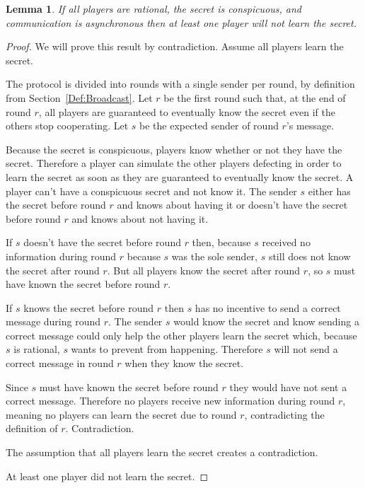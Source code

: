 \documentclass[12pt]{dalcsthesis}
\newtheorem{lemma}{Lemma}
\begin{document}
\begin{lemma}\label{Lem:Async:ConspicuousMustSacrifice}If all players are rational, the secret is conspicuous, and communication is asynchronous then at least one player will not learn the secret.\end{lemma}
\begin{proof}
We will prove this result by contradiction. Assume all players learn the secret.

The protocol is divided into rounds with a single sender per round, by definition from Section~\ref{Def:Broadcast}. Let $r$ be the first round such that, at the end of round $r$, all players are guaranteed to eventually know the secret even if the others stop cooperating. Let $s$ be the expected sender of round $r$'s message.

Because the secret is conspicuous, players know whether or not they have the secret. Therefore a player can simulate the other players defecting in order to learn the secret as soon as they are guaranteed to eventually know the secret. A player can't have a conspicuous secret and not know it. The sender $s$ either has the secret before round $r$ and knows about having it or doesn't have the secret before round $r$ and knows about not having it.

If $s$ doesn't have the secret before round $r$ then, because $s$ received no information during round $r$ because $s$ was the sole sender, $s$ still does not know the secret after round $r$. But all players know the secret after round $r$, so $s$ must have known the secret before round $r$.

If $s$ knows the secret before round $r$ then $s$ has no incentive to send a correct message during round $r$. The sender $s$ would know the secret and know sending a correct message could only help the other players learn the secret which, because $s$ is rational, $s$ wants to prevent from happening. Therefore $s$ will not send a correct message in round $r$ when they know the secret.

Since $s$ must have known the secret before round $r$ they would have not sent a correct message. Therefore no players receive new information during round $r$, meaning no players can learn the secret due to round $r$, contradicting the definition of $r$. Contradiction.

The assumption that all players learn the secret creates a contradiction.

At least one player did not learn the secret.
\end{proof}
\end{document}
